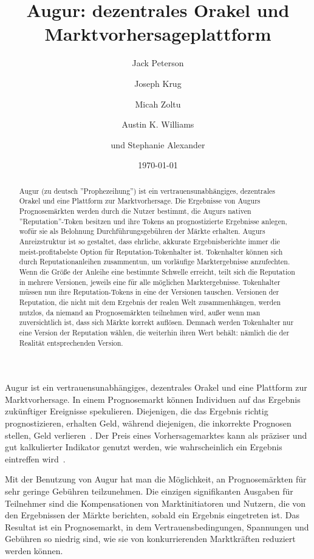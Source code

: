 \documentclass[floatfix,reprint,nofootinbib,amsmath,amssymb,epsfig,pre,floats,letterpaper,groupedaffiliation]{revtex4-1}
\theoremstyle{definition}
\theoremstyle{definition}
\theoremstyle{definition}
\begin{document}
\title{Augur: dezentrales Orakel und Marktvorhersageplattform}

\author{Jack Peterson}
\author{Joseph Krug}
\author{Micah Zoltu}
\author{Austin K. Williams}
\author{und Stephanie Alexander}

\date{\today}

\begin{abstract}
Augur (zu deutsch ''Prophezeihung'') ist ein vertrauensunabhängiges, dezentrales Orakel und eine Plattform zur Marktvorhersage. Die Ergebnisse von Augurs Prognosemärkten werden durch die Nutzer bestimmt, die Augurs nativen ''Reputation''-Token besitzen und ihre Tokens an prognostizierte Ergebnisse anlegen, wofür sie als Belohnung Durchführungsgebühren der Märkte erhalten. Augurs Anreizstruktur ist so gestaltet, dass ehrliche, akkurate Ergebnisberichte immer die meist-profitabelste Option für Reputation-Tokenhalter ist. Tokenhalter können sich durch Reputationanleihen zusammentun, um vorläufige Marktergebnisse anzufechten. Wenn die Größe der Anleihe eine bestimmte Schwelle erreicht, teilt sich die Reputation in mehrere Versionen, jeweils eine für alle möglichen Marktergebnisse. Tokenhalter müssen nun ihre Reputation-Tokens in eine der Versionen tauschen. Versionen der Reputation, die nicht mit dem Ergebnis der realen Welt zusammenhängen, werden nutzlos, da niemand an Prognosemärkten teilnehmen wird, außer wenn man zuversichtlich ist, dass sich Märkte korrekt auflösen. Demnach werden Tokenhalter nur eine Version der Reputation wählen, die weiterhin ihren Wert behält: nämlich die der Realität entsprechenden Version.
\end{abstract}

\maketitle

Augur ist ein vertrauensunabhängiges, dezentrales Orakel und eine Plattform zur Marktvorhersage. In einem Prognosemarkt können Individuen auf das Ergebnis zukünftiger Ereignisse spekulieren. Diejenigen, die das Ergebnis richtig prognostizieren, erhalten Geld, während diejenigen, die inkorrekte Prognosen stellen, Geld verlieren~\cite{Wolfers_2004, Surowiecki_2005, Hanson_2006}. Der Preis eines Vorhersagemarktes kann als präziser und gut kalkulierter Indikator genutzt werden, wie wahrscheinlich ein Ergebnis eintreffen wird~\cite{Pennock_2001, Manski_2004, Wolfers_2005, Goel_2010}.

Mit der Benutzung von Augur hat man die Möglichkeit, an Prognosemärkten für sehr geringe Gebühren teilzunehmen. Die einzigen signifikanten Ausgaben für Teilnehmer sind die Kompensationen von Marktinitiatoren und Nutzern, die von den Ergebnissen der Märkte berichten, sobald ein Ergebnis eingetreten ist. Das Resultat ist ein Prognosemarkt, in dem Vertrauensbedingungen, Spannungen und Gebühren so niedrig sind, wie sie von konkurrierenden Marktkräften reduziert werden können.
\end{document}
